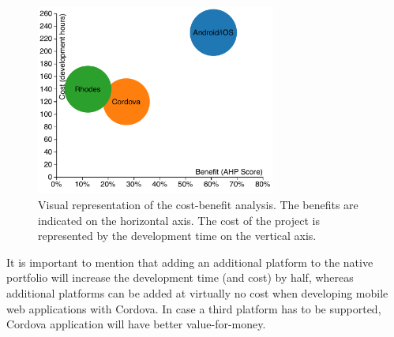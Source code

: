 \begin{figure}
    \centering
    \includegraphics[width=0.7\textwidth]{figs/benefit-cost.pdf}
    \caption{Visual representation of the cost-benefit analysis. The benefits are indicated on the horizontal axis. The cost of the project is represented by the development time on the vertical axis.}
    \label{fig:cost-benefit}
\end{figure}

It is important to mention that adding an additional platform to the native portfolio will increase the development time (and cost) by half, whereas additional platforms can be added at virtually no cost when developing mobile web applications with Cordova. In case a third platform has to be supported, Cordova application will have better value-for-money.
